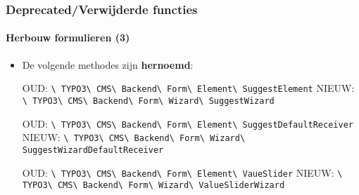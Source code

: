 \begin{frame}[fragile]
	\frametitle{Deprecated/Verwijderde functies}
	\framesubtitle{Herbouw formulieren (3)}

	\begin{itemize}

		\item De volgende methodes zijn \textbf{hernoemd}:\newline

			\smaller
				OUD:\tabto{0.8cm}
					\texttt{\textbackslash
						TYPO3\textbackslash
						CMS\textbackslash
						Backend\textbackslash
						Form\textbackslash
						Element\textbackslash
						SuggestElement}\newline
				NIEUW:\tabto{0.8cm}
					\texttt{\textbackslash
						TYPO3\textbackslash
						CMS\textbackslash
						Backend\textbackslash
						Form\textbackslash
						Wizard\textbackslash
						SuggestWizard}\newline

				OUD:\tabto{0.8cm}
					\texttt{\textbackslash
						TYPO3\textbackslash
						CMS\textbackslash
						Backend\textbackslash
						Form\textbackslash
						Element\textbackslash
						SuggestDefaultReceiver}\newline
				NIEUW:\tabto{0.8cm}
					\texttt{\textbackslash
						TYPO3\textbackslash
						CMS\textbackslash
						Backend\textbackslash
						Form\textbackslash
						Wizard\textbackslash
						SuggestWizardDefaultReceiver}\newline

				OUD:\tabto{0.8cm}
					\texttt{\textbackslash
						TYPO3\textbackslash
						CMS\textbackslash
						Backend\textbackslash
						Form\textbackslash
						Element\textbackslash
						VaueSlider}\newline
				NIEUW:\tabto{0.8cm}
					\texttt{\textbackslash
						TYPO3\textbackslash
						CMS\textbackslash
						Backend\textbackslash
						Form\textbackslash
						Wizard\textbackslash
						ValueSliderWizard}\newline

			\normalsize

	\end{itemize}

\end{frame}


